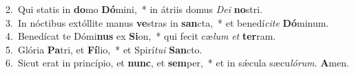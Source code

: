 {2.~}Qui statis in \textbf{do}mo \textbf{Dó}mini,~* in átriis domus \textit{De}\textit{i} \textbf{no}stri.\\
{3.~}In nóctibus extóllite manus \textbf{ve}stras in \textbf{san}cta,~* et benedí\textit{ci}\textit{te} \textbf{Dó}minum.\\
{4.~}Benedícat te Dómi\textbf{nus} ex \textbf{Si}on,~* qui fecit cæ\textit{lum} \textit{et} \textbf{ter}ram.\\
{5.~}Glória \textbf{Pa}tri, et \textbf{Fí}lio,~* et Spirí\textit{tu}\textit{i} \textbf{San}cto.\\
{6.~}Sicut erat in princípio, et \textbf{nunc}, et \textbf{sem}per,~* et in sǽcula sæcu\textit{ló}\textit{rum}. \textbf{A}men.\\
